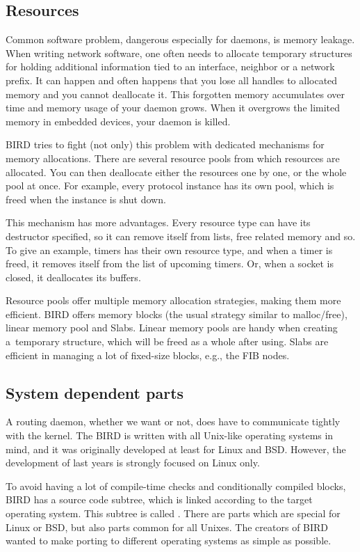 \subsection{Resources}
Common software problem, dangerous especially for daemons, is memory leakage.
When writing network software, one often needs to allocate temporary structures
for holding additional information tied to an interface, neighbor or a network
prefix. It can happen and often happens that you lose all handles to allocated
memory and you cannot deallocate it. This forgotten memory accumulates over time
and memory usage of your daemon grows. When it overgrows the limited memory
in embedded devices, your daemon is killed.

BIRD tries to fight (not only) this problem with dedicated mechanisms for
memory allocations. There are several resource pools from which resources are
allocated. You can then deallocate either the resources one by one, or the
whole pool at once. For example, every protocol instance has its own pool,
which is freed when the instance is shut down.

This mechanism has more advantages. Every resource type can have its destructor
specified, so it can remove itself from lists, free related memory and so. To
give an example, timers has their own resource type, and when a timer is freed,
it removes itself from the list of upcoming timers. Or, when a socket is
closed, it deallocates its buffers.

Resource pools offer multiple memory allocation strategies, making them more
efficient. BIRD offers memory blocks (the usual strategy similar to
malloc/free), linear memory pool and Slabs. Linear memory pools are handy when
creating a~temporary structure, which will be freed as a whole after using.
Slabs are efficient in managing a lot of fixed-size blocks, e.g., the FIB nodes.

\subsection{System dependent parts}
A routing daemon, whether we want or not, does have to communicate tightly with
the kernel. The BIRD is written with all Unix-like operating systems in mind,
and it was originally developed at least for Linux and BSD. However, the
development of last years is strongly focused on Linux only.

To avoid having a lot of compile-time checks and conditionally compiled blocks,
BIRD has a source code subtree, which is linked according to the target
operating system. This subtree is called . There are parts which
are special for Linux or BSD, but also parts common for all Unixes. The
creators of BIRD wanted to make porting to different operating systems as
simple as possible.

